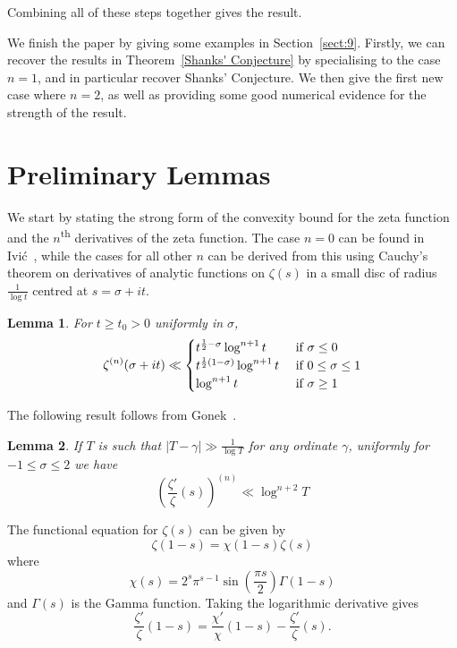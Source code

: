 \documentclass[12pt,a4paper,reqno]{amsart}
\newtheorem{lemma}{Lemma}
\theoremstyle{remark}
\numberwithin{equation}{section}
\begin{document}
Combining all of these steps together gives the result.

We finish the paper by giving some examples in Section~\ref{sect:9}. Firstly, we can recover the results in Theorem~\ref{Shanks' Conjecture} by specialising to the case $n=1$, and in particular recover Shanks' Conjecture. We then give the first new case where $n=2$, as well as providing some good numerical evidence for the strength of the result.

\section{Preliminary Lemmas}\label{sect:prelim}

We start by stating the strong form of the convexity bound for the zeta function and the $n$\textsuperscript{th} derivatives of the zeta function. The case $n=0$ can be found in Ivi\'c~\cite[Ch. I, Sect. 1.5]{Ivic}, while the cases for all other $n$ can be derived from this using Cauchy's theorem on derivatives of analytic functions on $\zeta (s)$ in a small disc of radius $\frac{1}{\log t}$ centred at $s=\sigma + it$.
\begin{lemma} \label{Convexity}
For $t \geq t_0 > 0$ uniformly in $\sigma$, 
\begin{equation*} \zeta^{(n)} (\sigma + it) \ll
\begin{cases}
t^{\frac{1}{2} - \sigma} \log^{n+1} t &\text{ if $\sigma \leq 0$}\\
t^{\frac{1}{2}(1- \sigma)} \log^{n+1} t &\text{ if $ 0 \leq \sigma \leq 1$}\\
\log^{n+1} t &\text{ if $\sigma \geq 1$}\\
\end{cases}
\end{equation*}
\end{lemma}


The following result follows from Gonek~\cite[Sect. 2, p. 126]{Gonek}. 
\begin{lemma}\label{lem:bound on log deriv zeta}
If $T$ is such that $|T-\gamma|\gg \frac{1}{\log T}$ for any ordinate $\gamma$, uniformly for $-1\leq \sigma \leq 2$ we have
\begin{equation}\label{eq:bound on log deriv zeta}
\left( \frac{\zeta '}{\zeta}(s) \right)^{(n)} \ll \log^{n+2} T
\end{equation}
\end{lemma}


The functional equation for $\zeta(s)$ can be given by
\begin{equation}
\zeta (1-s) = \chi (1-s) \zeta (s) \label{eq:FuncEqu2}
\end{equation}
where
\[
\chi (s) = 2^s \pi^{s-1} \sin \left( \frac{\pi s}{2} \right) \Gamma (1-s)
\]
and $\Gamma(s)$ is the Gamma function. Taking the logarithmic derivative gives
\begin{equation}
\frac{\zeta '}{\zeta} (1-s) = \frac{ \chi '}{\chi} (1-s) - \frac{\zeta '}{\zeta} (s). \label{eq:LogDeriv}
\end{equation}
\end{document}
